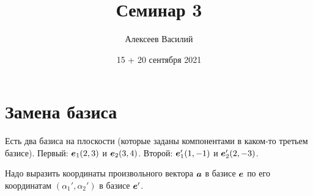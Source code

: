 \documentclass[a4paper,12pt]{article}
\author{Алексеев Василий}
\title{Семинар 3}
\date{15 + 20 сентября 2021}
\begin{document}
  \maketitle
  
  \tableofcontents

  \thispagestyle{empty}
  
  \newpage
  


  \section{Замена базиса}
  
  \begin{problem}[4.7]
    Есть два базиса на плоскости (которые заданы компонентами в каком-то третьем базисе).
    Первый: $\boldsymbol e_1(2, 3)$ и $\boldsymbol e_2(3, 4)$.
    Второй: $\boldsymbol e_1'(1, -1)$ и $\boldsymbol e_2'(2, -3)$.
    
    Надо выразить координаты произвольного вектора $\boldsymbol a$ в базисе $\boldsymbol e$ по его координатам $(\alpha_1', \alpha_2')$ в базисе $\boldsymbol e'$.
  \end{problem}
  
\end{document}
